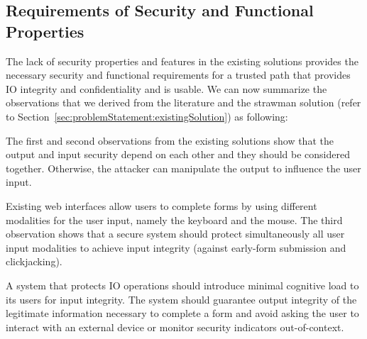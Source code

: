 \subsection{Requirements of Security and Functional Properties}
\label{sec:problemStatement:goals}

The lack of security properties and features in the existing solutions provides the necessary security and functional requirements for a trusted path that provides IO integrity and confidentiality and is usable. We can now summarize the observations that we derived from the literature and the strawman solution (refer to Section~\ref{sec:problemStatement:existingSolution}) as following:

The first and second observations from the existing solutions show that the output and input security depend on each other and they should be considered together. Otherwise, the attacker can manipulate the output to influence the user input.

Existing web interfaces allow users to complete forms by using different modalities for the user input, namely the keyboard and the mouse.
The third observation shows that a secure system should protect simultaneously all user input modalities to achieve input integrity (against early-form submission and clickjacking).


A system that protects IO operations should introduce minimal cognitive load to its users for input integrity.
The system should guarantee output integrity of the legitimate information necessary to complete a form and avoid asking the user to interact with an external device or monitor security indicators out-of-context.


